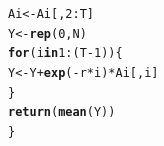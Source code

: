 \documentclass[10pt,a4paper]{report}\usepackage[]{graphicx}\usepackage[]{color}
\makeatletter
\newcommand{\hlnum}[1]{\textcolor[rgb]{0.686,0.059,0.569}{#1}}%
\newcommand{\hlopt}[1]{\textcolor[rgb]{0,0,0}{#1}}%
\newcommand{\hlstd}[1]{\textcolor[rgb]{0.345,0.345,0.345}{#1}}%
\newcommand{\hlkwa}[1]{\textcolor[rgb]{0.161,0.373,0.58}{\textbf{#1}}}%
\newcommand{\hlkwb}[1]{\textcolor[rgb]{0.69,0.353,0.396}{#1}}%
\newcommand{\hlkwd}[1]{\textcolor[rgb]{0.737,0.353,0.396}{\textbf{#1}}}%
\newenvironment{kframe}{%
 \def\at@end@of@kframe{}%
 \ifinner\ifhmode%
  \def\at@end@of@kframe{\end{minipage}}%
  \begin{minipage}{\columnwidth}%
 \fi\fi%
 \def\FrameCommand##1{\hskip\@totalleftmargin \hskip-\fboxsep
 \colorbox{shadecolor}{##1}\hskip-\fboxsep
     \hskip-\linewidth \hskip-\@totalleftmargin \hskip\columnwidth}%
 \MakeFramed {\advance\hsize-\width
   \@totalleftmargin\z@ \linewidth\hsize
   \@setminipage}}%
 {\par\unskip\endMakeFramed%
 \at@end@of@kframe}
\makeatother
\begin{document}
\begin{kframe}
\begin{alltt}
  \hlstd{Ai} \hlkwb{<-} \hlstd{Ai[,}\hlnum{2}\hlopt{:}\hlstd{T]}
  \hlstd{Y} \hlkwb{<-} \hlkwd{rep}\hlstd{(}\hlnum{0}\hlstd{,N)}
  \hlkwa{for} \hlstd{(i} \hlkwa{in} \hlnum{1}\hlopt{:}\hlstd{(T}\hlopt{-}\hlnum{1}\hlstd{))\{}
    \hlstd{Y} \hlkwb{<-} \hlstd{Y}\hlopt{+}\hlkwd{exp}\hlstd{(}\hlopt{-}\hlstd{r}\hlopt{*}\hlstd{i)}\hlopt{*}\hlstd{Ai[,i]}
  \hlstd{\}}
  \hlkwd{return}\hlstd{(}\hlkwd{mean}\hlstd{(Y))}
\hlstd{\}}
\end{alltt}
\end{kframe}
\end{document}
